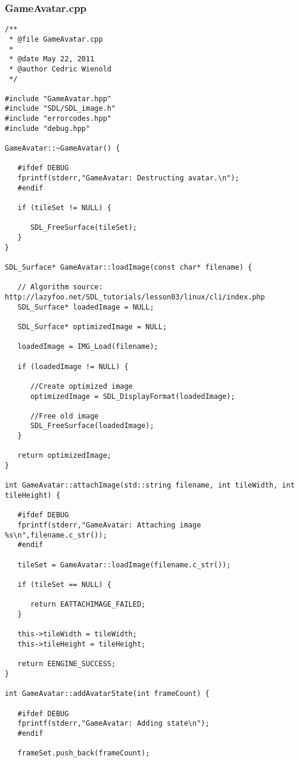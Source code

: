 \documentclass[12pt]{article}
\begin{document}
\subsubsection{GameAvatar.cpp}
\begin{lstlisting}[breaklines]
/**
 * @file GameAvatar.cpp
 *
 * @date May 22, 2011
 * @author Cedric Wienold
 */

#include "GameAvatar.hpp"
#include "SDL/SDL_image.h"
#include "errorcodes.hpp"
#include "debug.hpp"

GameAvatar::~GameAvatar() {

   #ifdef DEBUG
   fprintf(stderr,"GameAvatar: Destructing avatar.\n");
   #endif

   if (tileSet != NULL) {
      
      SDL_FreeSurface(tileSet);
   }
}

SDL_Surface* GameAvatar::loadImage(const char* filename) {

   // Algorithm source: http://lazyfoo.net/SDL_tutorials/lesson03/linux/cli/index.php
   SDL_Surface* loadedImage = NULL;

   SDL_Surface* optimizedImage = NULL;

   loadedImage = IMG_Load(filename);

   if (loadedImage != NULL) {

      //Create optimized image
      optimizedImage = SDL_DisplayFormat(loadedImage);

      //Free old image
      SDL_FreeSurface(loadedImage);
   }

   return optimizedImage;
}

int GameAvatar::attachImage(std::string filename, int tileWidth, int tileHeight) {

   #ifdef DEBUG
   fprintf(stderr,"GameAvatar: Attaching image %s\n",filename.c_str());
   #endif
   
   tileSet = GameAvatar::loadImage(filename.c_str());
   
   if (tileSet == NULL) {
      
      return EATTACHIMAGE_FAILED;
   }
   
   this->tileWidth = tileWidth;
   this->tileHeight = tileHeight;
   
   return EENGINE_SUCCESS;
}

int GameAvatar::addAvatarState(int frameCount) {

   #ifdef DEBUG
   fprintf(stderr,"GameAvatar: Adding state\n");
   #endif
   
   frameSet.push_back(frameCount);
   

\end{lstlisting}
\end{document}
